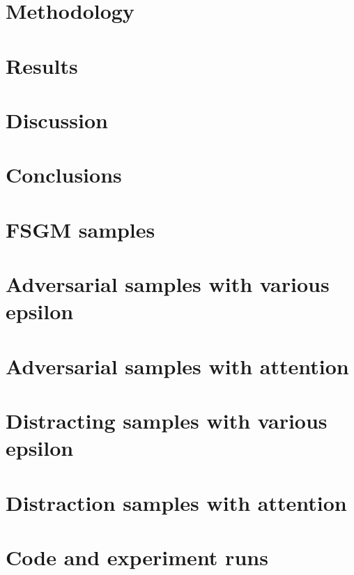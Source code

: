 \documentclass[a4paper,10pt]{article}
\begin{document}
\newpage
\section{Methodology}\label{chapter:methodology}


\newpage
\section{Results}\label{chapter:results}


\newpage
\section{Discussion}\label{chapter:discussion}


\newpage
\section{Conclusions}\label{chapter:conclusions}


\clearemptydoublepage

%



\clearemptydoublepage

\appendix
{}

\section{FSGM samples}
\label{appendix:fast_noise_examples}

\newpage
\section{Adversarial samples with various epsilon}\label{appendix:adversarial_samples_various_epsilon}

\section{Adversarial samples with attention}\label{appendix:adversarial_samples_with_attention}

\newpage
\section{Distracting samples with various epsilon}\label{appendix:distracting_samples_various_epsilon}

\newpage
\section{Distraction samples with attention}\label{appendix:distracting_samples_with_attention}

\newpage
\section{Code and experiment runs}\label{appendix:links_to_repo}

\newpage
\end{document}
